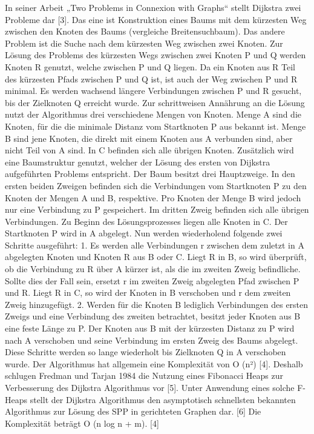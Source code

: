 In seiner Arbeit „Two Problems in Connexion with Graphs“ stellt Dijkstra zwei Probleme dar [3]. Das eine ist Konstruktion eines Baums mit dem kürzesten Weg zwischen den Knoten des Baums (vergleiche Breitensuchbaum). Das andere Problem ist die Suche nach dem kürzesten Weg zwischen zwei Knoten.
Zur Lösung des Problems des kürzesten Wegs zwischen zwei Knoten P und Q werden Knoten R genutzt, welche zwischen P und Q liegen. Da ein Knoten aus R Teil des kürzesten Pfads zwischen P und Q ist, ist auch der Weg zwischen P und R minimal. Es werden wachsend längere Verbindungen zwischen P und R gesucht, bis der Zielknoten Q erreicht wurde.
Zur schrittweisen Annährung an die Lösung nutzt der Algorithmus drei verschiedene Mengen von Knoten. Menge A sind die Knoten, für die die minimale Distanz vom Startknoten P aus bekannt ist. Menge B sind jene Knoten, die direkt mit einem Knoten aus A verbunden sind, aber nicht Teil von A sind. In C befinden sich alle übrigen Knoten.
Zusätzlich wird eine Baumstruktur genutzt, welcher der Lösung des ersten von Dijkstra aufgeführten Problems entspricht. Der Baum besitzt drei Hauptzweige. In den ersten beiden Zweigen befinden sich die Verbindungen vom Startknoten P zu den Knoten der Mengen A und B, respektive. Pro Knoten der Menge B wird jedoch nur eine Verbindung zu P gespeichert. Im dritten Zweig befinden sich alle übrigen Verbindungen. 
Zu Beginn des Lösungsprozesses liegen alle Knoten in C. Der Startknoten P wird in A abgelegt. Nun werden wiederholend folgende zwei Schritte ausgeführt:
1.	Es werden alle Verbindungen r zwischen dem zuletzt in A abgelegten Knoten und Knoten R aus B oder C. Liegt R in B, so wird überprüft, ob die Verbindung zu R über A kürzer ist, als die im zweiten Zweig befindliche. Sollte dies der Fall sein, ersetzt r im zweiten Zweig abgelegten Pfad zwischen P und R. Liegt R in C, so wird der Knoten in B verschoben und r dem zweiten Zweig hinzugefügt.
2.	Werden für die Knoten B lediglich Verbindungen des ersten Zweigs und eine Verbindung des zweiten betrachtet, besitzt jeder Knoten aus B eine feste Länge zu P. Der Knoten aus B mit der kürzesten Distanz zu P wird nach A verschoben und seine Verbindung im ersten Zweig des Baums abgelegt.
Diese Schritte werden so lange wiederholt bis Zielknoten Q in A verschoben wurde.
Der Algorithmus hat allgemein eine Komplexität von O (n²) [4]. Deshalb schlugen Fredman und Tarjan 1984 die Nutzung eines Fibonacci Heaps zur Verbesserung des Dijkstra Algorithmus vor [5]. Unter Anwendung eines solche F-Heaps stellt der Dijkstra Algorithmus den asymptotisch schnellsten bekannten Algorithmus zur Lösung des SPP in gerichteten Graphen dar. [6] Die Komplexität beträgt O (n log n + m). [4]


